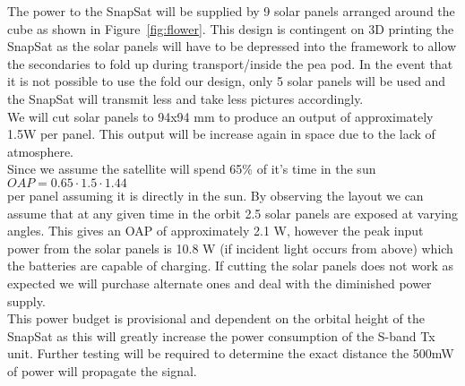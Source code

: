 The power to the SnapSat will be supplied by 9 solar panels arranged around the cube as shown in Figure~\ref{fig:flower}.  This design is contingent on 3D printing the SnapSat as the solar panels will have to be depressed into the framework to allow the secondaries to fold up during transport/inside the pea pod.  In the event that it is not possible to use the fold our design, only 5 solar panels will be used and the SnapSat will transmit less and take less pictures accordingly. \\
\noindent
We will cut solar panels to 94x94 mm to produce an output of approximately 1.5W per panel.  This output will be increase again in space due to the lack of atmosphere.\\
Since we assume the satellite will spend 65\% of it's time in the sun $OAP = 0.65\cdot 1.5\cdot1.44$ \\ per panel assuming it is directly in the sun. 
By observing the layout we can assume that at any given time in the orbit 2.5 solar panels are exposed at varying angles. This gives an OAP of approximately 2.1 W, however the peak input power from the solar panels is 10.8 W (if incident light occurs from above) which the batteries are capable of charging. If cutting the solar panels does not work as expected we will purchase alternate ones and deal with the diminished power supply. \\
\noindent
This power budget is provisional and dependent on the orbital height of the SnapSat as this will greatly increase the power consumption of the S-band Tx unit. Further testing will be required to determine the exact distance the 500mW of power will propagate the signal.

